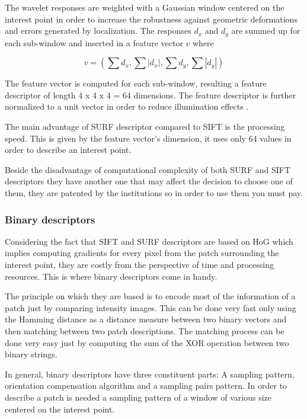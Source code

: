 \documentclass[9pt,shortpaper,twoside,web]{ieeecolor}
\begin{document}
The wavelet responses are weighted with a Gaussian window centered on the interest point in order to increase the robustness against geometric deformations and errors generated by localization. The responses $d_x$ and $d_y$ are summed up for each sub-window and inserted in a feature vector $v$ where

\begin{equation}
\label{eq9}
v = ( \sum d_x , \sum |d_x|, \sum d_y, \sum |d_y| ) 
\end{equation}

The feature vector is computed for each sub-window, resulting a feature descriptor of length 4 x 4 x 4 = 64 dimensions. The feature descriptor is further normalized to a unit vector in order to reduce illumination effects \cite{b5}.

The main advantage of SURF descriptor compared to SIFT is the processing speed. This is given by the feature vector's dimension, it uses only 64 values in order to describe an interest point.

Beside the disadvantage of computational complexity of both SURF and SIFT descriptors they have another one that may affect the decision to choose one of them, they are patented by the institutions so in order to use them you must pay.
\\

\subsubsection{Binary descriptors}
Considering the fact that SIFT and SURF descriptors are based on HoG which implies computing gradients for every pixel from the patch surrounding the interest point, they are costly from the perspective of time and processing resources. This is where binary descriptors come in handy. 

The principle on which they are based is to encode most of the information of a patch just by comparing intensity images. This can be done very fast only using the Hamming distance as a distance measure between two binary vectors and then matching between two patch descriptions. The matching process can be done very easy just by computing the sum of the XOR operation between two binary strings.

In general, binary descriptors have three constituent parts: A sampling pattern, orientation compensation algorithm and a sampling pairs pattern. In order to describe a patch is needed a sampling pattern of a window of various size centered on the interest point.
\end{document}
